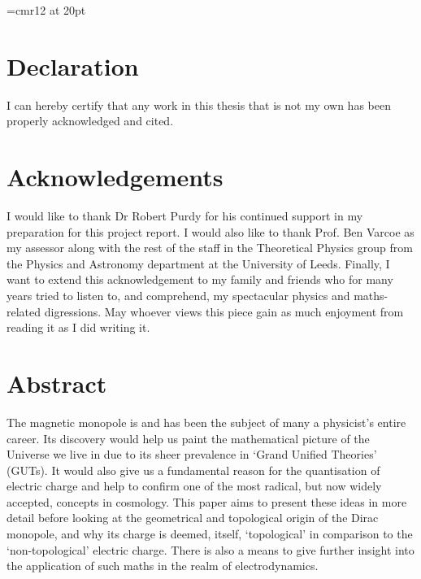 \documentclass[fleqn, twocolumn, 10pt]{article}
\begin{document}
\thispagestyle{plain}
\font\myfont=cmr12 at 20pt
\onecolumn
\fontsize{11}{14}\selectfont
\section*{\centering \huge Declaration}
\vspace{0.75cm}
I can hereby certify that any work in this thesis that is not my own has been properly acknowledged and cited.
\newpage
\clearpage


\thispagestyle{plain}
\onecolumn
\section*{\centering \huge Acknowledgements}
\vspace{0.75cm}
I would like to thank Dr Robert Purdy for his continued support in my preparation for this project report. I would also like to thank Prof. Ben Varcoe as my assessor along with the rest of the staff in the Theoretical Physics group from the Physics and Astronomy department at the University of Leeds. Finally, I want to extend this acknowledgement to my family and friends who for many years tried to listen to, and comprehend, my spectacular physics and maths-related digressions. May whoever views this piece gain as much enjoyment from reading it as I did writing it.
\clearpage


\thispagestyle{plain}
\onecolumn
\section*{\centering \huge Abstract}
\vspace{0.75cm}
The magnetic monopole is and has been the subject of many a physicist's entire career. Its discovery would help us paint the mathematical picture of the Universe we live in due to its sheer prevalence in `Grand Unified Theories' (GUTs). It would also give us a fundamental reason for the quantisation of electric charge and help to confirm one of the most radical, but now widely accepted, concepts in cosmology. This paper aims to present these ideas in more detail before looking at the geometrical and topological origin of the Dirac monopole, and why its charge is deemed, itself, `topological' in comparison to the `non-topological' electric charge. There is also a means to give further insight into the application of such maths in the realm of electrodynamics.
\clearpage
\fontsize{11}{15}\selectfont
\thispagestyle{plain}
\tableofcontents
\thispagestyle{plain}
\clearpage
\restoregeometry
\fontsize{10}{12}\selectfont
\end{document}
